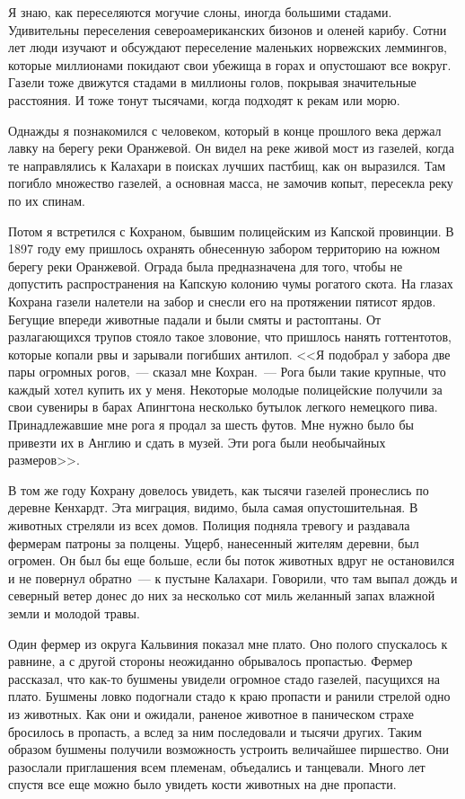\documentclass[12pt,a4paper,twoside,openany,svgnames]{memoir}
\begin{document}
Я знаю, как переселяются могучие слоны, иногда большими стадами. Удивительны переселения североамериканских бизонов и оленей карибу. Сотни лет люди изучают и обсуждают переселение маленьких норвежских леммингов, которые миллионами покидают свои убежища в горах и опустошают все вокруг. Газели тоже движутся стадами в миллионы голов, покрывая значительные расстояния. И тоже тонут тысячами, когда подходят к рекам или морю.

Однажды я познакомился с человеком, который в конце прошлого века держал лавку на берегу реки Оранжевой. Он видел на реке живой мост из газелей, когда те направлялись к Калахари в поисках лучших пастбищ, как он выразился. Там погибло множество газелей, а основная масса, не замочив копыт, пересекла реку по их спинам.

Потом я встретился с Кохраном, бывшим полицейским из Капской провинции. В 1897 году ему пришлось охранять обнесенную забором территорию на южном берегу реки Оранжевой. Ограда была предназначена для того, чтобы не допустить распространения на Капскую колонию чумы рогатого скота. На глазах Кохрана газели налетели на забор и снесли его на протяжении пятисот ярдов. Бегущие впереди животные падали и были смяты и растоптаны. От разлагающихся трупов стояло такое зловоние, что пришлось нанять готтентотов, которые копали рвы и зарывали погибших антилоп. <<Я подобрал у забора две пары огромных рогов,~--- сказал мне Кохран.~--- Рога были такие крупные, что каждый хотел купить их у меня. Некоторые молодые полицейские получили за свои сувениры в барах Апингтона несколько бутылок легкого немецкого пива. Принадлежавшие мне рога я продал за шесть футов. Мне нужно было бы привезти их в Англию и сдать в музей. Эти рога были необычайных размеров>>.

В том же году Кохрану довелось увидеть, как тысячи газелей пронеслись по деревне Кенхардт. Эта миграция, видимо, была самая опустошительная. В животных стреляли из всех домов. Полиция подняла тревогу и раздавала фермерам патроны за полцены. Ущерб, нанесенный жителям деревни, был огромен. Он был бы еще больше, если бы поток животных вдруг не остановился и не повернул обратно~--- к пустыне Калахари. Говорили, что там выпал дождь и северный ветер донес до них за несколько сот миль желанный запах влажной земли и молодой травы.

Один фермер из округа Кальвиния показал мне плато. Оно полого спускалось к равнине, а с другой стороны неожиданно обрывалось пропастью. Фермер рассказал, что как-то бушмены увидели огромное стадо газелей, пасущихся на плато. Бушмены ловко подогнали стадо к краю пропасти и ранили стрелой одно из животных. Как они и ожидали, раненое животное в паническом страхе бросилось в пропасть, а вслед за ним последовали и тысячи других. Таким образом бушмены получили возможность устроить величайшее пиршество. Они разослали приглашения всем племенам, объедались и танцевали. Много лет спустя все еще можно было увидеть кости животных на дне пропасти.
\end{document}
